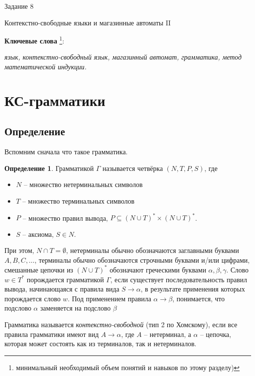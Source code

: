 \documentclass[12pt]{article}
\theoremstyle{definiton}
\theoremstyle{definition}
\theoremstyle{definition}
\newtheorem{Def}{Определение}
\let\es\emptyset
\begin{document}
\centerline{\LARGE Задание 8}

\medskip

\begin{center}
	{\Large Контекстно-свободные языки и магазинные автоматы II}
\end{center}

\bigskip



{\bf Ключевые слова }\footnote{минимальный необходимый объем понятий и навыков по
этому разделу)}:{\em  язык, контекстно-свободный язык, магазинный автомат, грамматика, метод математической индукции. %

}


\section{КС-грамматики}

\subsection{Определение}
Вспомним сначала что такое грамматика.

\begin{Def}
	Грамматикой $\Gamma$ называется четвёрка $(N, T, P, S)$, где
	\begin{itemize}
		\item $N$ -- множество нетерминальных символов
		\item $T$ -- множество терминальных символов
		\item $P$ -- множество правил вывода, $P \subseteq (N\cup T)^* \times (N\cup T)^*$.
		\item $S$ -- аксиома, $S \in N$.
	\end{itemize}
	При этом, $N\cap T = \es$, нетерминалы обычно обозначаются заглавными буквами $A, B, C,\ldots$, терминалы обычно обозначаются строчными буквами и/или цифрами, смешанные цепочки из $(N\cup T)^*$ обозначают греческими буквами $\alpha, \beta, \gamma$. Слово $w \in T^*$ порождается грамматикой $\Gamma$, если существует последовательность правил вывода, начинающаяся с правила вида $S \to \alpha$, в результате применения которых порождается слово $w$. Под применением правила $\alpha \to \beta$, понимается, что подслово $\alpha$ заменяется на подслово $\beta$
\end{Def}

Грамматика называется \emph{контекстно-свободной} (тип 2 по Хомскому), если все правила грамматики имеют вид $A \to \alpha$, где $A$ -- нетерминал, а $\alpha$ -- цепочка, которая может состоять как из терминалов, так и нетерминалов.
\end{document}
